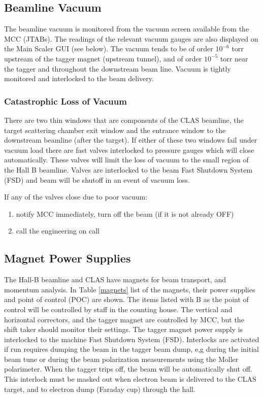 \documentclass[12pt]{article}
\begin{document}
\subsection{Beamline Vacuum}
\indent

The beamline vacuum is monitored from the vacuum screen available from the MCC (JTABs). The readings of the relevant vacuum gauges are also displayed on the Main Scaler GUI (see below). The vacuum tends to be of order \( 10^{-6} \) torr upstream of the tagger magnet (upstream tunnel), and of order \( 10^{-5} \) torr
near the tagger and throughout the downstream beam line. Vacuum is tightly monitored and interlocked to the beam delivery. 


\subsubsection{Catastrophic Loss of Vacuum}
\indent

There are two thin windows that are components of the CLAS beamline, the target scattering chamber exit window
and the entrance window to the downstream beamline (after the target). If either of these two windows fail under vacuum
load there are fast valves interlocked to pressure gauges which will close
automatically. These valves will limit the loss of vacuum to the small region  of the Hall B beamline. Valves are interlocked to the beam Fast Shutdown System (FSD) and beam will be shutoff in an event of vacuum loss.

If any of the valves close due to poor vacuum: 

\begin{enumerate}
\item notify MCC immediately, turn off the beam (if it is not already OFF)
\item call the engineering on call 
\end{enumerate}

\subsection{Magnet Power Supplies}
\indent

The Hall-B beamline and CLAS have magnets for beam transport, and momentum analysis. In Table \ref{magnets} list of the magnets, their power supplies
and point of control (POC) are shown. The items listed with B
as the point of control will be controlled by staff in the counting
house. The vertical and horizontal correctors, and the tagger magnet are controlled
by MCC, but the shift taker should monitor their settings. The tagger
magnet power supply is interlocked to the machine Fast Shutdown System (FSD). Interlocks are activated if run requires dumping the beam in the tagger beam dump, e,g during the initial beam tune or during the beam polarization measurements using the Moller polarimeter. When the tagger
trips off, the beam will be automatically shut off. This interlock must 
be masked out when electron beam is delivered to the CLAS target, and to electron dump (Faraday cup) through the hall. 
\end{document}
